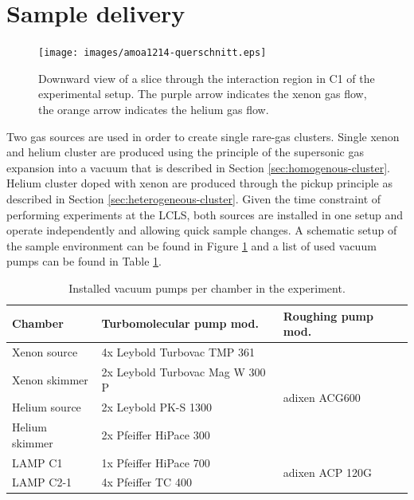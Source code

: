 \section{Sample delivery}\label{sec:sample-delivery}
\begin{figure}
	\centering
		\texttt{[image: images/amoa1214-querschnitt.eps]}
	\caption[Sideview of double sample jet configuration.]{Downward view of a slice through the interaction region in C1 of the experimental setup. The purple arrow indicates the xenon gas flow, the orange arrow indicates the helium gas flow.}
	\label{fig:Overview-Jetalignment}
\end{figure}
Two gas sources are used in order to create single rare-gas clusters. Single xenon and helium cluster are produced using the principle of the supersonic gas expansion into a vacuum that is described in Section \ref{sec:homogenous-cluster}. Helium cluster doped with xenon are produced through the pickup principle as described in Section \ref{sec:heterogeneous-cluster}. Given the time constraint of performing experiments at the LCLS, both sources are installed in one setup and operate independently and allowing quick sample changes. A schematic setup of the sample environment can be found in Figure \ref{fig:Overview-Jetalignment} and a list of used vacuum pumps can be found in Table \ref{tab:vacuum-table}.\\
\begin{table}
	\centering
\begin{tabular}{ | l | l | l | }
\hline
	\textbf{Chamber} & \textbf{Turbomolecular pump mod.} & \textbf{Roughing pump mod.} \\ \hline
	Xenon source & 4x Leybold Turbovac TMP 361 & \multirow{4}{*}{adixen ACG600} \\ 
	Xenon skimmer & 2x Leybold Turbovac Mag W 300 P &  \\ 
	Helium source & 2x Leybold PK-S 1300 & \\ 
	Helium skimmer & 2x Pfeiffer HiPace 300 & \\ \hline
	LAMP C1 & 1x Pfeiffer HiPace 700 & \multirow{2}{*}{adixen ACP 120G} \\ 
	LAMP C2-1 & 4x Pfeiffer TC 400 & \\ \hline
\end{tabular}
\caption[Installed vacuum pumps in the experiment.]{Installed vacuum pumps per chamber in the experiment.}
\label{tab:vacuum-table}
\end{table}
